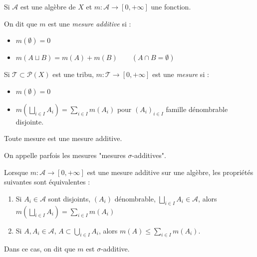 \documentclass[10pt,a4paper,notitlepage ]{report}
\begin{document}
\begin{definition}
	Si $\mathcal A$ est une algèbre de $X$ et $m:\mathcal A \rightarrow [0,+\infty]$ une fonction.
	
	On dit que $m$ est une \emph{mesure additive} si :
	\begin{itemize}
		\item $m(\emptyset) = 0$
		\item $m(A\sqcup B) = m(A) + m(B) \qquad (A\cap B = \emptyset)$
	\end{itemize}
\end{definition}

\begin{definition}
	Si $\mathcal T \subset \mathcal P(X)$ est une tribu, $m:\mathcal T \rightarrow [0,+\infty]$ est une \emph{mesure} si :
	\begin{itemize}
		\item $m(\emptyset) = 0$
		\item $m(\underset{i\in I}{\bigsqcup}A_i) = \sum_{i\in I}m(A_i)$ pour $(A_i)_{i\in I}$ famille dénombrable disjointe.
	\end{itemize}
\end{definition}
\begin{rem}
	Toute mesure est une mesure additive.
\end{rem}

\begin{rem}
On appelle parfois les mesures "mesures $\sigma$-additives".
\end{rem}

\begin{rem}
	Lorsque $m:\mathcal A \rightarrow [0,+\infty]$ est une mesure additive sur une algèbre, les propriétés suivantes sont équivalentes :
	\begin{enumerate}
		\item Si $A_i\in\mathcal A$ sont disjoints, $(A_i)$ dénombrable, $\underset{i\in I}{\bigsqcup}A_i \in \mathcal A$, alors $m(\underset{i\in I}{\bigsqcup}A_i) = \sum_{i\in I}m(A_i)$
		\item Si $A,A_i\in\mathcal A$, $A\subset \underset{i\in I}{\bigcup}A_i$, alors $m(A) \le \sum_{i\in I}m(A_i)$.
	\end{enumerate}
Dans ce cas, on dit que $m$ est $\sigma$-additive.
\end{rem}
\end{document}
